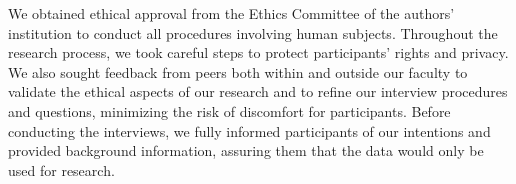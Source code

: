 We obtained ethical approval from the Ethics Committee of the authors' institution to conduct all procedures involving human subjects. Throughout the research process, we took careful steps to protect participants' rights and privacy. We also sought feedback from peers both within and outside our faculty to validate the ethical aspects of our research and to refine our interview procedures and questions, minimizing the risk of discomfort for participants. Before conducting the interviews, we fully informed participants of our intentions and provided background information, assuring them that the data would only be used for research. 